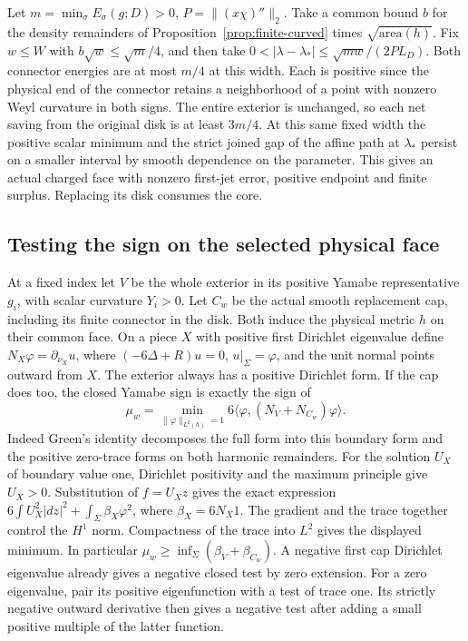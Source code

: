 \documentclass[11pt,letterpaper]{article}
\numberwithin{equation}{section}
\begin{document}
Let \(m=\min_\sigma E_\sigma(g;D)>0\), \(P=\|(x\chi)''\|_2\).
Take a common bound \(b\) for the density remainders of
Proposition~\ref{prop:finite-curved} times \(\sqrt{\mathrm{area}(h)}\).
Fix \(w\le W\) with \(b\sqrt w\le\sqrt m/4\), and then take
\(0<|\lambda-\lambda_*|\le\sqrt{mw}/(2PL_D)\).
Both connector energies are at most \(m/4\) at this width.
Each is positive since the physical end of the connector retains
a neighborhood of a point with nonzero Weyl curvature in both signs.
The entire exterior is unchanged, so each net saving from the
original disk is at least \(3m/4\). At this same fixed width
the positive scalar minimum and the strict joined gap of the
affine path at \(\lambda_*\) persist on a smaller interval by
smooth dependence on the parameter. This gives an actual charged
face with nonzero first-jet error, positive endpoint and finite
surplus. Replacing its disk consumes the core.

\subsection{Testing the sign on the selected physical face}
\label{sec:response}
At a fixed index let \(V\) be the whole exterior in its positive
Yamabe representative \(g_i\), with scalar curvature \(Y_i>0\).
Let \(C_w\) be the actual smooth replacement cap, including its
finite connector in the disk. Both induce the physical metric
\(h\) on their common face. On a piece \(X\) with positive first
Dirichlet eigenvalue define \(N_X\varphi=\partial_{\nu_X}u\),
where \((-6\Delta+R)u=0\), \(u|_\Sigma=\varphi\), and the unit
normal points outward from \(X\). The exterior always has a
positive Dirichlet form. If the cap does too, the closed Yamabe
sign is exactly the sign of
\[
 \mu_w=\min_{\|\varphi\|_{L^2(h)}=1}
              6\langle\varphi,(N_V+N_{C_w})\varphi\rangle .
\]
Indeed Green's identity decomposes the full form into this boundary
form and the positive zero-trace forms on both harmonic remainders.
For the solution \(U_X\) of boundary value one, Dirichlet positivity
and the maximum principle give \(U_X>0\). Substitution of \(f=U_X z\)
gives the exact expression \(6\int U_X^2|dz|^2+
\int_\Sigma\beta_X\varphi^2\), where \(\beta_X=6N_X1\).
The gradient and the trace together control the \(H^1\) norm.
Compactness of the trace into \(L^2\) gives the displayed minimum.
In particular \(\mu_w\ge\inf_\Sigma(\beta_V+\beta_{C_w})\).
A negative first cap Dirichlet eigenvalue already gives a negative
closed test by zero extension. For a zero eigenvalue, pair its
positive eigenfunction with a test of trace one. Its strictly
negative outward derivative then gives a negative test after
adding a small positive multiple of the latter function.
\end{document}
